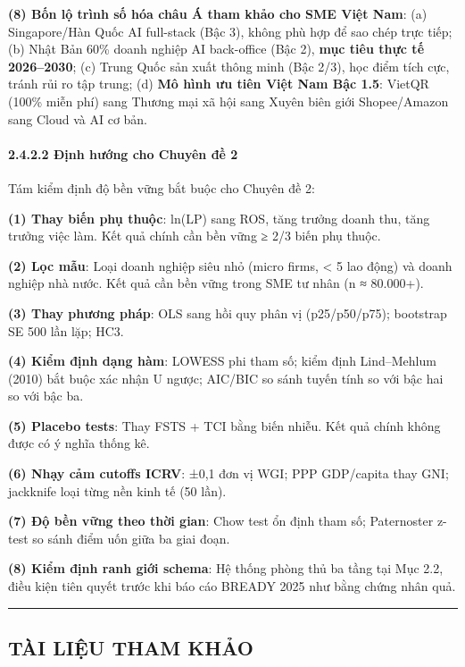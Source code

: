 \documentclass[
  a4paper,
  13pt]{extreport}
\begin{document}
\textbf{(8) Bốn lộ trình số hóa châu Á tham khảo cho SME Việt Nam}: (a)
Singapore/Hàn Quốc AI full-stack (Bậc 3), không phù hợp để sao chép trực
tiếp; (b) Nhật Bản 60\% doanh nghiệp AI back-office (Bậc 2), \textbf{mục
tiêu thực tế 2026--2030}; (c) Trung Quốc sản xuất thông minh (Bậc 2/3),
học điểm tích cực, tránh rủi ro tập trung; (d) \textbf{Mô hình ưu tiên
Việt Nam Bậc 1.5}: VietQR (100\% miễn phí) sang Thương mại xã hội sang
Xuyên biên giới Shopee/Amazon sang Cloud và AI cơ bản.

\hypertarget{ux111ux1ecbnh-hux1b0ux1edbng-cho-chuyuxean-ux111ux1ec1-2}{%
\paragraph{2.4.2.2 Định hướng cho Chuyên đề
2}\label{ux111ux1ecbnh-hux1b0ux1edbng-cho-chuyuxean-ux111ux1ec1-2}}

Tám kiểm định độ bền vững bắt buộc cho Chuyên đề 2:

\textbf{(1) Thay biến phụ thuộc}: ln(LP) sang ROS, tăng trưởng doanh
thu, tăng trưởng việc làm. Kết quả chính cần bền vững ≥ 2/3 biến phụ
thuộc.

\textbf{(2) Lọc mẫu}: Loại doanh nghiệp siêu nhỏ (micro firms,
\textless{} 5 lao động) và doanh nghiệp nhà nước. Kết quả cần bền vững
trong SME tư nhân (n ≈ 80.000+).

\textbf{(3) Thay phương pháp}: OLS sang hồi quy phân vị (p25/p50/p75);
bootstrap SE 500 lần lặp; HC3.

\textbf{(4) Kiểm định dạng hàm}: LOWESS phi tham số; kiểm định
Lind--Mehlum (2010) bắt buộc xác nhận U ngược; AIC/BIC so sánh tuyến
tính so với bậc hai so với bậc ba.

\textbf{(5) Placebo tests}: Thay FSTS + TCI bằng biến nhiễu. Kết quả
chính không được có ý nghĩa thống kê.

\textbf{(6) Nhạy cảm cutoffs ICRV}: ±0,1 đơn vị WGI; PPP GDP/capita thay
GNI; jackknife loại từng nền kinh tế (50 lần).

\textbf{(7) Độ bền vững theo thời gian}: Chow test ổn định tham số;
Paternoster z-test so sánh điểm uốn giữa ba giai đoạn.

\textbf{(8) Kiểm định ranh giới schema}: Hệ thống phòng thủ ba tầng tại
Mục 2.2, điều kiện tiên quyết trước khi báo cáo BREADY 2025 như bằng
chứng nhân quả.

\begin{center}\rule{0.5\linewidth}{0.5pt}\end{center}

\hypertarget{tuxe0i-liux1ec7u-tham-khux1ea3o}{%
\subsection{TÀI LIỆU THAM KHẢO}\label{tuxe0i-liux1ec7u-tham-khux1ea3o}}
\end{document}
